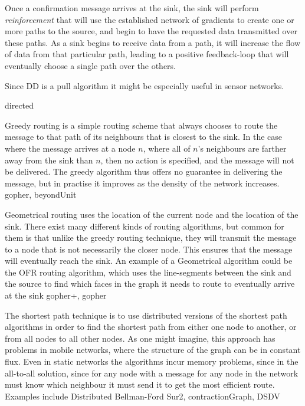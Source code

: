 \documentclass[letter, 12pt, english, draft]{article}
\begin{document}
\begin{description}
{Once a confirmation message arrives at the sink, the sink will perform \emph{reinforcement} that will use the established network of gradients to create one or more paths to the source, and begin to have the requested data transmitted over these paths. As a sink begins to receive data from a path, it will increase the flow of data from that particular path, leading to a positive feedback-loop that will eventually choose a single path over the others.

Since DD is a pull algorithm it might be especially useful in sensor networks.}
{directed}

{Greedy routing is a simple routing scheme that always chooses to route the message to that path of its neighbours that is closest to the sink. In the case where the message arrives at a node $n$, where all of $n$'s neighbours are farther away from the sink than $n$, then no action is specified, and the message will not be delivered. The greedy algorithm thus offers no guarantee in delivering the message, but in practise it improves as the density of the network increases.}
{gopher, beyondUnit}

{Geometrical routing uses the location of the current node and the location of the sink. There exist many different kinds of routing algorithms, but common for them is that unlike the greedy routing technique, they will transmit the message to a node that is not necessarily the closer node. This ensures that the message will eventually reach the sink. An example of a Geometrical algorithm could be the OFR \cite{gopher} routing algorithm, which uses the line-segments between the sink and the source to find which faces in the graph it needs to route to eventually arrive at the sink}
{gopher+, gopher}

      {The shortest path technique is to use distributed versions of the shortest path algorithms in order to find the shortest path from either one node to another, or from all nodes to all other nodes. As one might imagine, this approach has problems in mobile networks, where the structure of the graph can be in constant flux. Even in static networks the algorithms incur memory problems, since in the all-to-all solution, since for any node with a message for any node in the network must know which neighbour it must send it to get the most efficient route. Examples include Distributed Bellman-Ford}
{Sur2, contractionGraph, DSDV}

\end{description}
\end{document}
